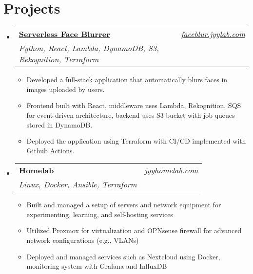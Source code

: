 \documentclass[letterpaper,11pt]{article}
\makeatletter
\newcommand{\resumeItem}[1]{
  \item\small{
    {#1 \vspace{-2pt}}
  }
}
\newcommand{\resumeSubheading}[4]{
  \vspace{-2pt}\item
    \begin{tabular*}{0.97\textwidth}[t]{l@{\extracolsep{\fill}}r}
      \textbf{#1} & #2 \\
      \textit{\small#3} & \textit{\small #4} \\
    \end{tabular*}\vspace{-7pt}
}
\newcommand{\resumeSubHeadingListStart}{\begin{itemize}[leftmargin=0.08in, label={}]}
\newcommand{\resumeSubHeadingListEnd}{\end{itemize}}
\newcommand{\resumeItemListStart}{\begin{itemize}[leftmargin=0.22in]}
\newcommand{\resumeItemListEnd}{\end{itemize}\vspace{-5pt}}
\makeatother
\begin{document}
\section{Projects}
    \resumeSubHeadingListStart
        \resumeSubheading
            {\textbf{\href{https://faceblur.jyylab.com}{Serverless Face Blurrer}}}{\emph{\href{https://faceblur.jyylab.com}{faceblur.jyylab.com}}}
            {Python, React, Lambda, DynamoDB, S3, Rekognition, Terraform}{}
            \resumeItemListStart
              \resumeItem{Developed a full-stack application that automatically blurs faces in images uploaded by users.}
              \resumeItem{Frontend built with React, middleware uses Lambda, Rekognition, SQS for event-driven architecture, backend uses S3 bucket with job queues stored in DynamoDB.}
              \resumeItem{Deployed the application using Terraform with CI/CD implemented with Github Actions.}
            \resumeItemListEnd
        \resumeSubheading
            {\textbf{\href{https://github.com/jamesyoung-15/homelab}{Homelab}}}{\emph{\href{https://jyyhomelab.com}{jyyhomelab.com}}}
            {Linux, Docker, Ansible, Terraform}{}
            \resumeItemListStart
            \resumeItem{Built and managed a setup of servers and network equipment for experimenting, learning, and self-hosting services}
            \resumeItem{Utilized Proxmox for virtualization and OPNsense firewall for advanced network configurations (e.g., VLANs)}
            \resumeItem{Deployed and managed services such as Nextcloud using Docker, monitoring system with Grafana and InfluxDB}
            \resumeItemListEnd
    \resumeSubHeadingListEnd
\end{document}
